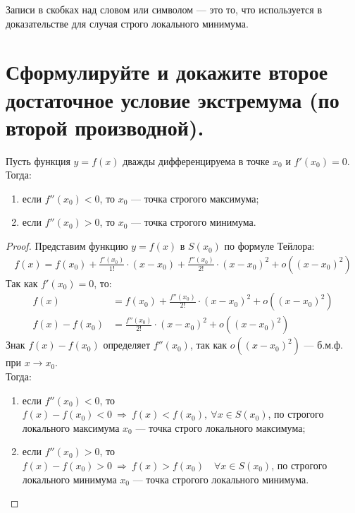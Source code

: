 \begin{note}
	Записи в скобках над словом или символом --- это то, что используется в доказательстве для случая строго локального минимума.
\end{note}

\section{Сформулируйте и докажите второе достаточное условие экстремума (по второй производной).}

\begin{theorem}
	Пусть функция $y=f(x)$ дважды дифференцируема в точке $x_0$ и $f'(x_0) = 0$. Тогда:
	\begin{enumerate}
		\item если $f''(x_0) < 0$, то $x_0$ --- точка строгого максимума;
		\item если $f''(x_0) > 0$, то $x_0$ --- точка строгого минимума.
	\end{enumerate}
\end{theorem}
\begin{proof}
	Представим функцию $y=f(x)$ в $S(x_0)$ по формуле Тейлора:
	\begin{align*}
		f(x) = f(x_0) + \frac{f'(x_0)}{1!}\cdot (x-x_0) +  \frac{f''(x_0)}{2!}\cdot (x-x_0)^2 + o\left((x-x_0)^2\right)
	\end{align*}
	Так как $f'(x_0) = 0$, то:
	\begin{align*}
		f(x)          & = f(x_0) + \frac{f''(x_0)}{2!}\cdot (x-x_0)^2 + o\left((x-x_0)^2\right) \\
		f(x) - f(x_0) & = \frac{f''(x_0)}{2!}\cdot (x-x_0)^2 + o\left((x-x_0)^2\right)
	\end{align*}
	Знак $f(x) - f(x_0)$ определяет $f''(x_0)$, так как $o\left((x-x_0)^2\right)$ --- б.м.ф. при $x\to x_0$.\\
	Тогда: \vspace{-8pt}
	\begin{enumerate}
		\item если $f''(x_0) < 0$, то $f(x) - f(x_0) < 0\ \Rightarrow\ f(x) < f(x_0),\ \forall x \in S(x_0)$, по  строгого локального максимума $x_0$ --- точка строго локального максимума;
		\item если $f''(x_0) > 0$, то $f(x) - f(x_0) > 0\ \Rightarrow\ f(x) > f(x_0)\quad \forall x \in S(x_0)$, по  строгого локального минимума $x_0$ --- точка строгого локального минимума.
	\end{enumerate}
\end{proof}


